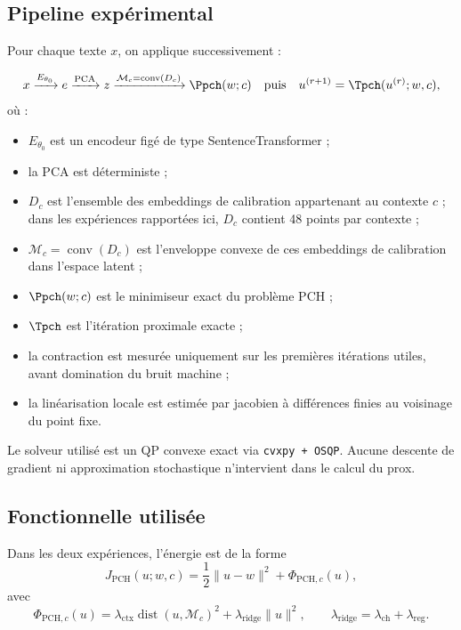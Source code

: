 \subsection{Pipeline expérimental}

Pour chaque texte \(x\), on applique successivement :

\[
x \xrightarrow{E_{\theta_0}} e \xrightarrow{\mathrm{PCA}} z \xrightarrow{\mathcal M_c=\operatorname{conv}(D_c)} \Ppch(w;c)
\quad\text{puis}\quad
u^{(r+1)}=\Tpch(u^{(r)};w,c),
\]
où :

\begin{itemize}
    \item \(E_{\theta_0}\) est un encodeur figé de type SentenceTransformer ;
    \item la PCA est déterministe ;
    \item \(D_c\) est l’ensemble des embeddings de calibration appartenant au contexte \(c\) ; dans les expériences rapportées ici, \(D_c\) contient 48 points par contexte ;
    \item \(\mathcal M_c = \operatorname{conv}(D_c)\) est l’enveloppe convexe de ces embeddings de calibration dans l’espace latent ;
    \item \(\Ppch(w;c)\) est le minimiseur exact du problème PCH ;
    \item \(\Tpch\) est l’itération proximale exacte ;
    \item la contraction est mesurée uniquement sur les premières itérations utiles, avant domination du bruit machine ;
    \item la linéarisation locale est estimée par jacobien à différences finies au voisinage du point fixe.
\end{itemize}

Le solveur utilisé est un QP convexe exact via \texttt{cvxpy + OSQP}. Aucune descente de gradient ni approximation stochastique n’intervient dans le calcul du prox.

\subsection{Fonctionnelle utilisée}

Dans les deux expériences, l’énergie est de la forme
\[
J_{\mathrm{PCH}}(u;w,c)
=
\frac12\|u-w\|^2+\Phi_{\mathrm{PCH},c}(u),
\]
avec
\[
\Phi_{\mathrm{PCH},c}(u)
=
\lambda_{\mathrm{ctx}}\operatorname{dist}(u,\mathcal M_c)^2
+\lambda_{\mathrm{ridge}}\|u\|^2,
\qquad
\lambda_{\mathrm{ridge}}=\lambda_{\mathrm{ch}}+\lambda_{\mathrm{reg}}.
\]

